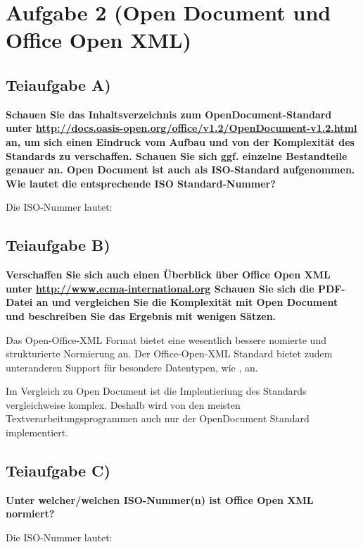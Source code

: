 \section{Aufgabe 2 (Open Document und Office Open XML)}

\subsection{Teiaufgabe A)}
\textbf{Schauen Sie das Inhaltsverzeichnis zum OpenDocument-Standard unter
\url{http://docs.oasis-open.org/office/v1.2/OpenDocument-v1.2.html} an, um sich
einen Eindruck vom Aufbau und von der Komplexität des Standards zu verschaffen. Schauen
Sie sich ggf. einzelne Bestandteile genauer an. Open Document ist auch als
ISO-Standard aufgenommen. Wie lautet die entsprechende ISO Standard-Nummer?}

Die ISO-Nummer lautet:

\subsection{Teiaufgabe B)}
\textbf{Verschaffen Sie sich auch einen Überblick über Office Open XML unter
\href{http://www.ecma-international.org/publications/files/ECMA-ST/ECMA-376,
Fifth Edition, Part 1 - Fundamentals And Markup Language
Reference.zip}{http://www.ecma-international.org} Schauen Sie sich die
PDF-Datei an und vergleichen Sie die Komplexität mit Open Document und
beschreiben Sie das Ergebnis mit wenigen Sätzen.}

Das Open-Office-XML Format bietet eine wesentlich bessere nomierte und
strukturierte Normierung an. Der Office-Open-XML Standard bietet zudem
unteranderen Support für besondere Datentypen, wie \zB {},
an.

Im Vergleich zu Open Document ist die Implentieriung des Standards
vergleichweise komplex. Deshalb wird von den meisten Textverarbeitungsprogrammen
auch nur der OpenDocument Standard implementiert.

\subsection{Teiaufgabe C)}
\textbf{Unter welcher/welchen ISO-Nummer(n) ist Office Open XML normiert?}

Die ISO-Nummer lautet:

\clearpage 

